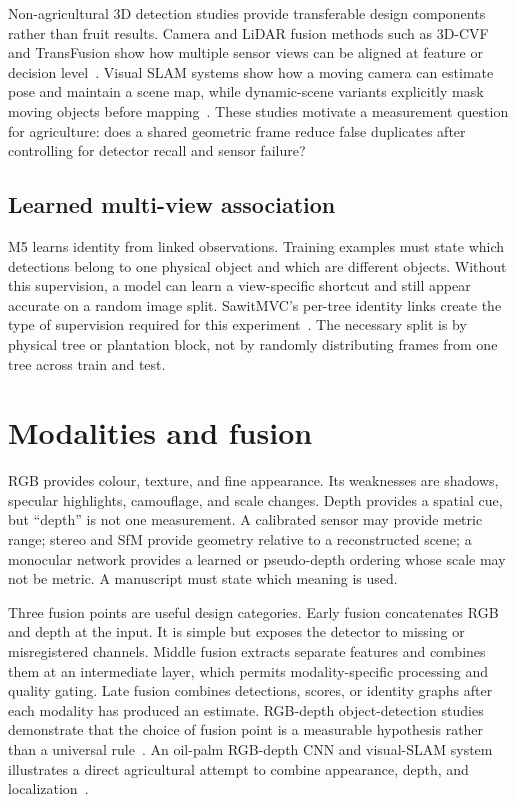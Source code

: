 Non-agricultural 3D detection studies provide transferable design components rather than fruit results. Camera and LiDAR fusion methods such as 3D-CVF and TransFusion show how multiple sensor views can be aligned at feature or decision level~\cite{yoo20203dcvf,bai2022transfusion}. Visual SLAM systems show how a moving camera can estimate pose and maintain a scene map, while dynamic-scene variants explicitly mask moving objects before mapping~\cite{bescos2018dynaslam}. These studies motivate a measurement question for agriculture: does a shared geometric frame reduce false duplicates after controlling for detector recall and sensor failure?

\subsection{Learned multi-view association}

M5 learns identity from linked observations. Training examples must state which detections belong to one physical object and which are different objects. Without this supervision, a model can learn a view-specific shortcut and still appear accurate on a random image split. SawitMVC's per-tree identity links create the type of supervision required for this experiment~\cite{indriani2026sawitmvc}. The necessary split is by physical tree or plantation block, not by randomly distributing frames from one tree across train and test.


\section{Modalities and fusion}
\label{sec:fusion}

RGB provides colour, texture, and fine appearance. Its weaknesses are shadows, specular highlights, camouflage, and scale changes. Depth provides a spatial cue, but ``depth'' is not one measurement. A calibrated sensor may provide metric range; stereo and SfM provide geometry relative to a reconstructed scene; a monocular network provides a learned or pseudo-depth ordering whose scale may not be metric. A manuscript must state which meaning is used.

Three fusion points are useful design categories. Early fusion concatenates RGB and depth at the input. It is simple but exposes the detector to missing or misregistered channels. Middle fusion extracts separate features and combines them at an intermediate layer, which permits modality-specific processing and quality gating. Late fusion combines detections, scores, or identity graphs after each modality has produced an estimate. RGB-depth object-detection studies demonstrate that the choice of fusion point is a measurable hypothesis rather than a universal rule~\cite{ophoff2019multimodal}. An oil-palm RGB-depth CNN and visual-SLAM system illustrates a direct agricultural attempt to combine appearance, depth, and localization~\cite{siong2021rgbdepthpalm}.

